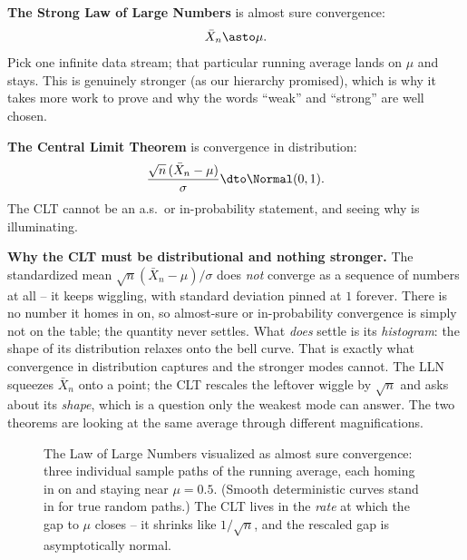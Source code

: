 \textbf{The Strong Law of Large Numbers} is almost sure convergence:
\[
  \bar X_n \asto \mu.
\]
Pick one infinite data stream; that particular running average lands on $\mu$ and
stays. This is genuinely stronger (as our hierarchy promised), which is why it takes
more work to prove and why the words ``weak'' and ``strong'' are well chosen.

\textbf{The Central Limit Theorem} is convergence in distribution:
\[
  \frac{\sqrt n\,(\bar X_n - \mu)}{\sigma} \dto \Normal(0,1).
\]
The CLT cannot be an a.s.\ or in-probability statement, and seeing why is illuminating.

\begin{happeningbox}
\textbf{Why the CLT must be distributional and nothing stronger.} The standardized
mean $\sqrt n(\bar X_n-\mu)/\sigma$ does \emph{not} converge as a sequence of numbers
at all -- it keeps wiggling, with standard deviation pinned at $1$ forever. There is
no number it homes in on, so almost-sure or in-probability convergence is simply not on
the table; the quantity never settles. What \emph{does} settle is its \emph{histogram}:
the shape of its distribution relaxes onto the bell curve. That is exactly what
convergence in distribution captures and the stronger modes cannot. The LLN squeezes
$\bar X_n$ onto a point; the CLT rescales the leftover wiggle by $\sqrt n$ and asks
about its \emph{shape}, which is a question only the weakest mode can answer. The two
theorems are looking at the same average through different magnifications.
\end{happeningbox}

\begin{figure}[H]
\centering
{}
\caption{The Law of Large Numbers visualized as almost sure convergence: three
individual sample paths of the running average, each homing in on and staying near
$\mu=0.5$. (Smooth deterministic curves stand in for true random paths.) The CLT lives
in the \emph{rate} at which the gap to $\mu$ closes -- it shrinks like $1/\sqrt n$, and
the rescaled gap is asymptotically normal.}
\label{ch22:fig-lln-paths}
\end{figure}

